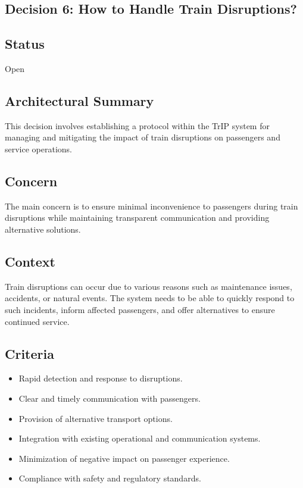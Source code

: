 \subsection{Decision 6: How to Handle Train Disruptions?}

\subsection*{Status}
Open

\subsection*{Architectural Summary}
This decision involves establishing a protocol within the TrIP system for managing and mitigating the impact of train disruptions on passengers and service operations.

\subsection*{Concern}
The main concern is to ensure minimal inconvenience to passengers during train disruptions while maintaining transparent communication and providing alternative solutions.

\subsection*{Context}
Train disruptions can occur due to various reasons such as maintenance issues, accidents, or natural events. The system needs to be able to quickly respond to such incidents, inform affected passengers, and offer alternatives to ensure continued service.

\subsection*{Criteria}
\begin{itemize}
    \item Rapid detection and response to disruptions.
    \item Clear and timely communication with passengers.
    \item Provision of alternative transport options.
    \item Integration with existing operational and communication systems.
    \item Minimization of negative impact on passenger experience.
    \item Compliance with safety and regulatory standards.
\end{itemize}

